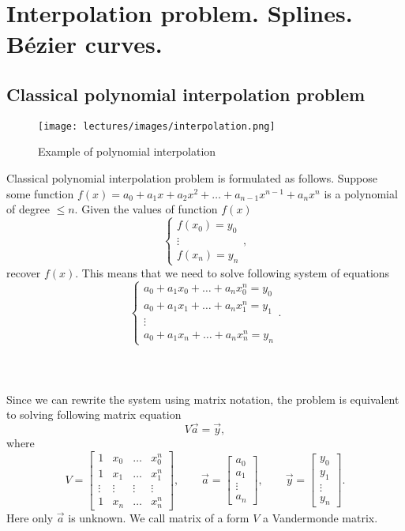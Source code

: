 \section{Interpolation problem. Splines. Bézier curves.}

\subsection*{Classical polynomial interpolation problem}
    \begin{wrapfigure}[13]{r}{0.43\columnwidth}
        \texttt{[image: lectures/images/interpolation.png]}
        \caption*{Example of polynomial interpolation}
    \end{wrapfigure}
    Classical polynomial interpolation problem is formulated as follows. Suppose some function $f(x) = a_0 + a_1x + a_2x^2 + \ldots + a_{n-1}x^{n-1} + a_{n} x^n$ is a polynomial of degree $\leq n$. Given the values of function $f(x)$ 
    \[
        \left\{ \begin{array}{c}
            f(x_0) = y_0 \\
            \vdots \\
            f(x_n) = y_n
        \end{array}\right.,
    \]
    recover $f(x)$. This means that we need to solve following system of equations
    \[
        \left\{
            \begin{array}{c}
                a_0 + a_1 x_0 + \ldots + a_n x_0^n = y_0 \\
                a_0 + a_1 x_1 + \ldots + a_n x_1^n = y_1 \\
                \vdots \\
                a_0 + a_1 x_n + \ldots + a_n x_n^n = y_n
            \end{array}
        \right..
    \]
\\\\\\
Since we can rewrite the system using matrix notation, the problem is equivalent to solving following matrix equation
\[
    V\vec{a} = \vec{y},
\]
where
\[
    V = \begin{bmatrix}
            1 & x_0 & \ldots & x_0^n \\
            1 & x_1 & \ldots & x_1^n \\
            \vdots & \vdots & \vdots & \vdots\\
            1 & x_n & \ldots & x_n^n
        \end{bmatrix}, \qquad 
    \vec{a} = 
        \begin{bmatrix}
            a_0 \\a_1 \\ \vdots \\ a_n
        \end{bmatrix},\qquad 
    \vec{y} = 
        \begin{bmatrix}
            y_0 \\y_1 \\ \vdots \\ y_n
        \end{bmatrix}.
\]
    Here only $\vec{a}$ is unknown. We call matrix of a form $V$ a Vandermonde matrix.

